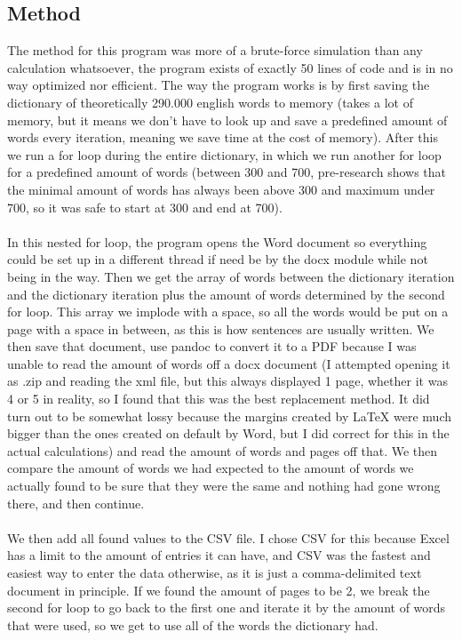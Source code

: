 \documentclass[9pt, a4paper]{article}
\begin{document}
\subsection{Method}
\label{sec:method}
The method for this program was more of a brute-force simulation than any calculation whatsoever, the program exists of exactly 50 lines of code and is in no way optimized nor efficient. The way the program works is by first saving the dictionary of theoretically 290.000 english words to memory (takes a lot of memory, but it means we don't have to look up and save a predefined amount of words every iteration, meaning we save time at the cost of memory). After this we run a for loop during the entire dictionary, in which we run another for loop for a predefined amount of words (between 300 and 700, pre-research shows that the minimal amount of words has always been above 300 and maximum under 700, so it was safe to start at 300 and end at 700).\\
\\
In this nested for loop, the program opens the Word document so everything could be set up in a different thread if need be by the docx module while not being in the way. Then we get the array of words between the dictionary iteration and the dictionary iteration plus the amount of words determined by the second for loop. This array we implode with a space, so all the words would be put on a page with a space in between, as this is how sentences are usually written. We then save that document, use pandoc to convert it to a PDF because I was unable to read the amount of words off a docx document (I attempted opening it as .zip and reading the xml file, but this always displayed 1 page, whether it was 4 or 5 in reality, so I found that this was the best replacement method. It did turn out to be somewhat lossy because the margins created by LaTeX were much bigger than the ones created on default by Word, but I did correct for this in the actual calculations) and read the amount of words and pages off that. We then compare the amount of words we had expected to the amount of words we actually found to be sure that they were the same and nothing had gone wrong there, and then continue.\\
\\
We then add all found values to the CSV file. I chose CSV for this because Excel has a limit to the amount of entries it can have, and CSV was the fastest and easiest way to enter the data otherwise, as it is just a comma-delimited text document in principle. If we found the amount of pages to be 2, we break the second for loop to go back to the first one and iterate it by the amount of words that were used, so we get to use all of the words the dictionary had.
\end{document}
